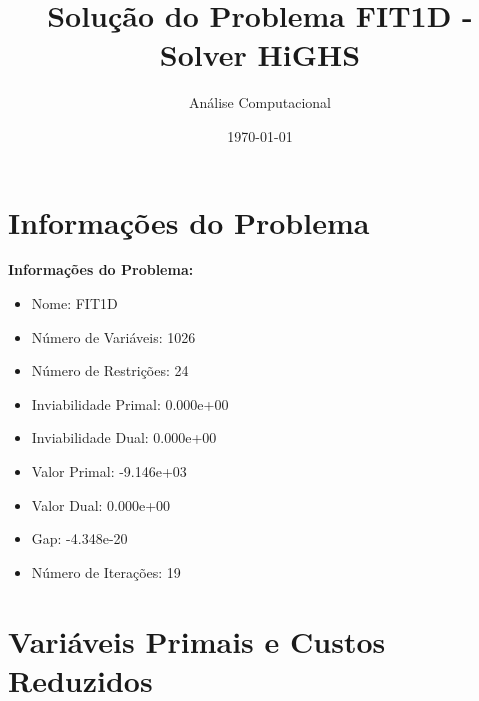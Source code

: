 \documentclass[12pt]{article}
\title{Solução do Problema FIT1D - Solver HiGHS}
\author{Análise Computacional}
\date{\today}
\begin{document}
\maketitle

\section{Informações do Problema}

\textbf{Informações do Problema:}
\begin{itemize}
\item Nome: FIT1D
\item Número de Variáveis: 1026
\item Número de Restrições: 24
\item Inviabilidade Primal: 0.000e+00
\item Inviabilidade Dual: 0.000e+00
\item Valor Primal: -9.146e+03
\item Valor Dual: 0.000e+00
\item Gap: -4.348e-20
\item Número de Iterações: 19
\end{itemize}


\section{Variáveis Primais e Custos Reduzidos}
\end{document}
